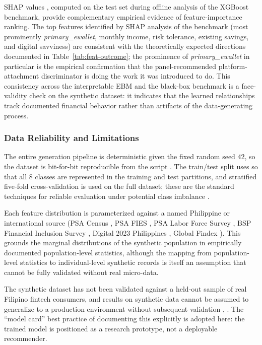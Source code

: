 \documentclass{icsthesis}
\begin{document}
\begin{mainmatter}
					SHAP values \cite{ref18}, computed on the test set during offline analysis of the XGBoost benchmark, provide complementary empirical evidence of feature-importance ranking. The top features identified by SHAP analysis of the benchmark (most prominently \emph{primary\_ewallet}, monthly income, risk tolerance, existing savings, and digital savviness) are consistent with the theoretically expected directions documented in Table~\ref{tab:feat-outcome}; the prominence of \emph{primary\_ewallet} in particular is the empirical confirmation that the panel-recommended platform-attachment discriminator is doing the work it was introduced to do. This consistency across the interpretable EBM and the black-box benchmark is a face-validity check on the synthetic dataset: it indicates that the learned relationships track documented financial behavior rather than artifacts of the data-generating process.

				\subsubsection{Data Reliability and Limitations}
					The entire generation pipeline is deterministic given the fixed random seed $42$, so the dataset is bit-for-bit reproducible from the script \cite{ref60}. The train/test split uses  so that all 8 classes are represented in the training and test partitions, and stratified five-fold cross-validation is used on the full dataset; these are the standard techniques for reliable evaluation under potential class imbalance \cite{ref59}.

					Each feature distribution is parameterized against a named Philippine or international source (PSA Census \cite{ref39}, PSA FIES \cite{ref40}, PSA Labor Force Survey \cite{ref41}, BSP Financial Inclusion Survey \cite{ref35}, Digital 2023 Philippines \cite{ref42}, Global Findex \cite{ref66}). This grounds the marginal distributions of the synthetic population in empirically documented population-level statistics, although the mapping from population-level statistics to individual-level synthetic records is itself an assumption that cannot be fully validated without real micro-data.

					The synthetic dataset has not been validated against a held-out sample of real Filipino fintech consumers, and results on synthetic data cannot be assumed to generalize to a production environment without subsequent validation \cite{ref46}, \cite{ref29}. The ``model card'' best practice of documenting this explicitly \cite{ref61} is adopted here: the trained model is positioned as a research prototype, not a deployable recommender.


\end{mainmatter}
\end{document}
